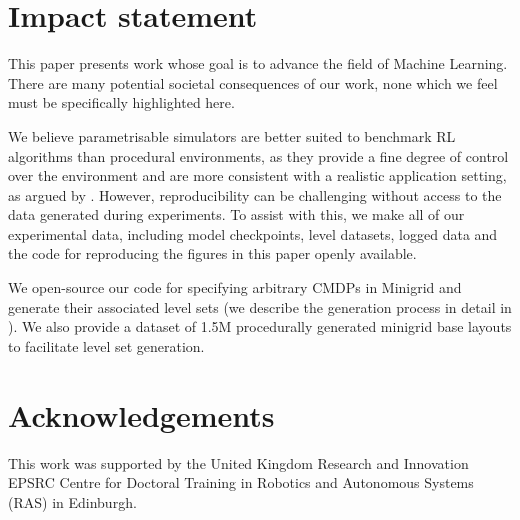 \documentclass{article}
\theoremstyle{plain}
\theoremstyle{definition}
\theoremstyle{remark}
\begin{document}
\section*{Impact statement}
This paper presents work whose goal is to advance the field of Machine Learning. There are many potential societal consequences of our work, none which we feel must be specifically highlighted here.

We believe parametrisable simulators are better suited to benchmark RL algorithms than procedural environments, as they provide a fine degree of control over the environment and are more consistent with a realistic application setting, as argued by \citet{kirk2023survey}. However, reproducibility can be challenging without access to the data generated during experiments. To assist with this, we make all of our experimental data, including model checkpoints, level datasets, logged data and the code for reproducing the figures in this paper openly available.

We open-source our code for specifying arbitrary CMDPs in Minigrid and generate their associated level sets (we describe the generation process in detail in ). We also provide a dataset of 1.5M procedurally generated minigrid base layouts to facilitate level set generation.%

\section*{Acknowledgements}
This work was supported by the United Kingdom Research and Innovation EPSRC Centre for Doctoral Training in Robotics and Autonomous Systems (RAS) in Edinburgh.




\newpage
\onecolumn
\appendix


\end{document}
